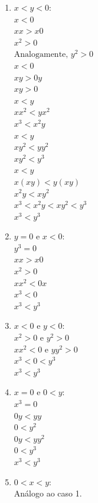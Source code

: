\documentclass[a4paper,12pt]{article}
\begin{document}
\begin{enumerate}
\begin{enumerate}
 \begin{enumerate}
 \item $x<y<0:$\\
 $x<0$\\
 $xx>x0$\\
 $x^2>0$\\
 $\mbox{Analogamente, } y^2>0$\\
 $x<0$\\
 $xy>0y$\\
 $xy>0$\\
 $x<y$\\
 $xx^2<yx^2$\\
 $x^3<x^2y$\\
 $x<y$\\
 $xy^2<yy^2$\\
 $xy^2<y^3$\\
 $x<y$\\
 $x(xy)<y(xy)$\\
 $x^2y<xy^2$\\
 $x^3<x^2y<xy^2<y^3$\\
 $x^3<y^3$\\
 
 
 \item $y=0 \mbox{ e } x<0:$\\
 $y^3=0$\\
 $xx>x0$\\
 $x^2>0$\\
 $xx^2<0x$\\
 $x^3<0$\\
 $x^3<y^3$\\
 
 \item $x<0 \mbox{ e } y<0:$\\
 $x^2>0 \mbox{ e } y^2>0$\\
 $xx^2<0 \mbox{ e } yy^2>0$\\
 $x^3<0<y^3$\\
 $x^3<y^3$
 
 \item $x=0 \mbox{ e } 0<y:$\\
 $x^3=0$\\
 $0y<yy$\\
 $0<y^2$\\
 $0y<yy^2$\\
 $0<y^3$\\
 $x^3<y^3$\\
 
 \item $0<x<y:$\\
 Análogo ao caso 1.\\
 

\end{enumerate}
\end{enumerate}
\end{enumerate}
\end{document}
